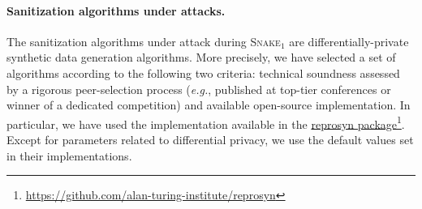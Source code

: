 \documentclass{article}
\newcommand{\myhref}[2]{\href{#1}{#2}\footnote{\url{#1}}}
\newcommand{\name}{\textsc{Snake}\xspace}
\begin{document}
\paragraph{Sanitization algorithms under attacks.}
The sanitization algorithms under attack during \name$_1$ are differentially-private synthetic data generation algorithms.
More precisely, we have selected a set of algorithms according to the following two criteria: technical soundness assessed by a rigorous peer-selection process (\emph{e.g.}, published at top-tier conferences or winner of a dedicated competition) and available open-source implementation.
In particular, we have used the implementation available in the \myhref{https://github.com/alan-turing-institute/reprosyn}{reprosyn package}.
Except for parameters related to differential privacy, we use the default values set in their implementations.
\end{document}

